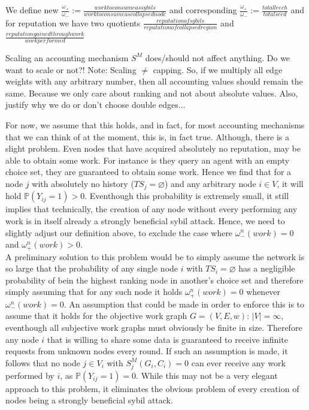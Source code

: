 \documentclass[11pt,a4paper]{article}
\theoremstyle{definition}
\theoremstyle{theorem}
\theoremstyle{proposition}
\theoremstyle{corollary}
\theoremstyle{lemma}
\theoremstyle{example}
\theoremstyle{remark}
\begin{document}
\begin{center}
We define new $\frac{\omega_{+}}{\omega_{-}}:=\frac{work to consume as sybils}{work to consume as collapsed node}$ and corresponding $\frac{\omega_{+}}{\omega_{-}}:=\frac{total leech}{total seed}$ and for reputation we have two quotients $\frac{reputation of sybils}{reputation of collapsed region}$ and $\frac{reputation gained through work}{work performed}$
\end{center}



\begin{center}
Scaling an accounting mechanism $S^M$ does/should not affect anything. Do we want to scale or not?! Note: Scaling $\neq$ capping. So, if we multiply all edge weights with any arbitrary number, then all accounting values should remain the same. Because we only care about ranking and not about absolute values. Also, justify why we do or don't choose double edges...
\end{center}

\noindent{}For now, we assume that this holds, and in fact, for most accounting mechanisms that we can think of at the moment, this is, in fact true. Although, there is a slight problem. Even nodes that have acquired absolutely no reputation, may be able to obtain some work. For instance is they query an agent with an empty choice set, they are guaranteed to obtain some work. Hence we find that for a node $j$ with absolutely no history ($TS_j = \varnothing$) and any arbitrary node $i\in{}V$, it will hold $\mathbb{P}(Y_{ij}=1)>0$. Eventhough this probability is extremely small, it still implies that technically, the creation of any node without every performing any work is in itself   already a strongly beneficial sybil attack. Hence, we need to slightly adjust our definition above, to exclude the case where $\omega^n_{-}(work)=0$ and $\omega^n_{+}(work)>0$. \vspace{1em}\\

\noindent{}A preliminary solution to this problem would be to simply assume the network is so large that the probability of any single node $i$ with $TS_i=\varnothing$ has a negligible probability of bein the highest ranking node in another's choice set and therefore simply assuming that for any such node it holds $\omega^n_{+}(work)=0$ whenever $\omega^n_{-}(work)=0$. An assumption that could be made in order to enforce this is to assume that it holds for the objective work graph $G=(V,E,w)$: $|V|=\infty$, eventhough all subjective work graphs must obviously be finite in size. Therefore any node $i$ that is willing to share some data is guaranteed to receive infinite requests from unknown nodes every round. If such an assumption is made, it follows that no node $j\in{}V_i$ with $S^M_j(G_i,C_i)=0$ can ever receive any work performed by $i$, as $\mathbb{P}(Y_{ij}=1)=0$. While this may not be a very elegant approach to this problem, it eliminates the obvious problem of every creation of nodes being a strongly beneficial sybil attack. \vspace{1em}\\
\end{document}
